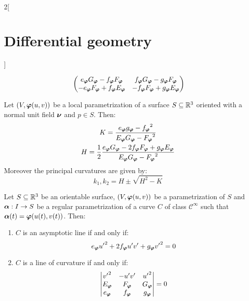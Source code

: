 \documentclass[../../../main.tex]{subfiles}
\begin{document}
\begin{multicols}{2}[\section{Differential geometry}]
\begin{proposition}
$$      \begin{pmatrix}
        e_{\boldsymbol{\mathrm{\varphi}}}G_{\boldsymbol{\mathrm{\varphi}}}-f_{\boldsymbol{\mathrm{\varphi}}}F_{\boldsymbol{\mathrm{\varphi}}}  & f_{\boldsymbol{\mathrm{\varphi}}}G_{\boldsymbol{\mathrm{\varphi}}}-g_{\boldsymbol{\mathrm{\varphi}}}F_{\boldsymbol{\mathrm{\varphi}}}  \\
        -e_{\boldsymbol{\mathrm{\varphi}}}F_{\boldsymbol{\mathrm{\varphi}}}+f_{\boldsymbol{\mathrm{\varphi}}}E_{\boldsymbol{\mathrm{\varphi}}} & -f_{\boldsymbol{\mathrm{\varphi}}}F_{\boldsymbol{\mathrm{\varphi}}}+g_{\boldsymbol{\mathrm{\varphi}}}E_{\boldsymbol{\mathrm{\varphi}}}
      \end{pmatrix}\!\!$$
  \end{proposition}
  \begin{corollary}
    Let $(V,\boldsymbol{\mathrm{\varphi}}(u,v))$ be a local parametrization of a surface $S\subseteq\mathbb{R}^3$ oriented with a normal unit field $\boldsymbol{\mathrm{\nu}}$ and $p\in S$. Then:
    \begin{gather*}
      K =\frac{e_{\boldsymbol{\mathrm{\varphi}}}g_{\boldsymbol{\mathrm{\varphi}}}-{f_{\boldsymbol{\mathrm{\varphi}}}}^2}{E_{\boldsymbol{\mathrm{\varphi}}}G_{\boldsymbol{\mathrm{\varphi}}}-{F_{\boldsymbol{\mathrm{\varphi}}}}^2}               \\
      H =\frac{1}{2}\frac{e_{\boldsymbol{\mathrm{\varphi}}}G_{\boldsymbol{\mathrm{\varphi}}}-2f_{\boldsymbol{\mathrm{\varphi}}}F_{\boldsymbol{\mathrm{\varphi}}}+g_{\boldsymbol{\mathrm{\varphi}}}E_{\boldsymbol{\mathrm{\varphi}}}}{E_{\boldsymbol{\mathrm{\varphi}}}G_{\boldsymbol{\mathrm{\varphi}}}-{F_{\boldsymbol{\mathrm{\varphi}}}}^2}
    \end{gather*}
    Moreover the principal curvatures are given by: $$k_1,k_2=H\pm\sqrt{H^2-K}$$
  \end{corollary}
  \begin{proposition}
    Let $S\subseteq\mathbb{R}^3$ be an orientable surface, $(V,\boldsymbol{\mathrm{\varphi}}(u,v))$ be a parametrization of $S$ and $\boldsymbol{\mathrm{\alpha}}:I\rightarrow S$ be a regular parametrization of a curve $C$ of class $\mathcal{C}^\infty$ such that $\boldsymbol{\mathrm{\alpha}}(t)=\boldsymbol{\mathrm{\varphi}}(u(t),v(t))$. Then:
    \begin{enumerate}
      \item $C$ is an asymptotic line if and only if: $$e_{\boldsymbol{\mathrm{\varphi}}}{u'}^2+2f_{\boldsymbol{\mathrm{\varphi}}}u'v'+g_{\boldsymbol{\mathrm{\varphi}}}{v'}^2=0$$
      \item $C$ is a line of curvature if and only if:
            $$
              \begin{vmatrix}
                {v'}^2         & -u'v'          & {u'}^2         \\
                E_{\boldsymbol{\mathrm{\varphi}}} & F_{\boldsymbol{\mathrm{\varphi}}} & G_{\boldsymbol{\mathrm{\varphi}}} \\
                e_{\boldsymbol{\mathrm{\varphi}}} & f_{\boldsymbol{\mathrm{\varphi}}} & g_{\boldsymbol{\mathrm{\varphi}}}
              \end{vmatrix}=0
            $$
    \end{enumerate}
  \end{proposition}

\end{multicols}
\end{document}
